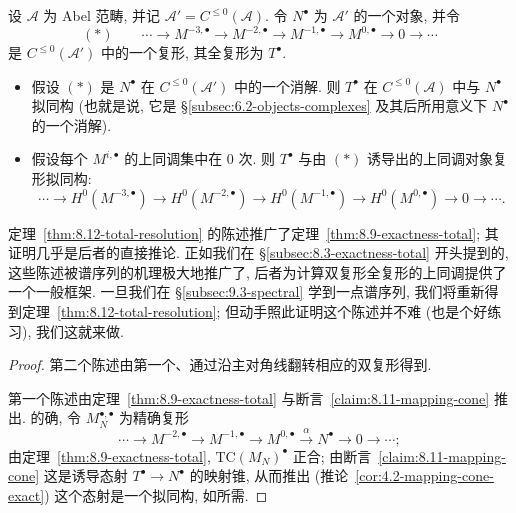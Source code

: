 \begin{theorem}\label{thm:8.12-total-resolution}
设 $\mathcal{A}$ 为 Abel 范畴, 并记 $\mathcal{A}'=C^{\le 0}(\mathcal{A})$. 令 $N^\bullet$ 为 $\mathcal{A}'$ 的一个对象, 并令
\[
(*)\qquad \cdots \longrightarrow M^{-3,\bullet} \longrightarrow M^{-2,\bullet} \longrightarrow M^{-1,\bullet} \longrightarrow M^{0,\bullet} \longrightarrow 0 \longrightarrow \cdots
\]
是 $C^{\le 0}(\mathcal{A}')$ 中的一个复形, 其全复形为 $T^\bullet$.
\begin{itemize}
\item 假设 $(*)$ 是 $N^\bullet$ 在 $C^{\le 0}(\mathcal{A}')$ 中的一个消解. 则 $T^\bullet$ 在 $C^{\le 0}(\mathcal{A})$ 中与 $N^\bullet$ 拟同构 (也就是说, 它是 \S\ref{subsec:6.2-objects-complexes} 及其后所用意义下 $N^\bullet$ 的一个消解).
\item 假设每个 $M^{i,\bullet}$ 的上同调集中在 $0$ 次. 则 $T^\bullet$ 与由 $(*)$ 诱导出的上同调对象复形拟同构:
\[
\cdots \longrightarrow H^0(M^{-3,\bullet}) \longrightarrow H^0(M^{-2,\bullet}) \longrightarrow H^0(M^{-1,\bullet}) \longrightarrow H^0(M^{0,\bullet}) \longrightarrow 0 \longrightarrow \cdots .
\]
\end{itemize}
\end{theorem}

定理~\ref{thm:8.12-total-resolution} 的陈述推广了定理~\ref{thm:8.9-exactness-total}; 其证明几乎是后者的直接推论. 正如我们在 \S\ref{subsec:8.3-exactness-total} 开头提到的, 这些陈述被谱序列的机理极大地推广了, 后者为计算双复形全复形的上同调提供了一个一般框架. 一旦我们在 \S\ref{subsec:9.3-spectral} 学到一点谱序列, 我们将重新得到定理~\ref{thm:8.12-total-resolution}; 但动手照此证明这个陈述并不难 (也是个好练习), 我们这就来做.

\begin{proof}
第二个陈述由第一个、通过沿主对角线翻转相应的双复形得到.

第一个陈述由定理~\ref{thm:8.9-exactness-total} 与断言~\ref{claim:8.11-mapping-cone} 推出. 的确, 令 $M_N^{\bullet,\bullet}$ 为精确复形
\[
\cdots\longrightarrow M^{-2,\bullet}\longrightarrow M^{-1,\bullet}\longrightarrow M^{0,\bullet}\xrightarrow{\alpha}N^\bullet\longrightarrow 0\longrightarrow\cdots;
\]
由定理~\ref{thm:8.9-exactness-total}, $\mathrm{TC}(M_N)^\bullet$ 正合; 由断言~\ref{claim:8.11-mapping-cone} 这是诱导态射 $T^\bullet\to N^\bullet$ 的映射锥, 从而推出 (推论~\ref{cor:4.2-mapping-cone-exact}) 这个态射是一个拟同构, 如所需.
\end{proof}

